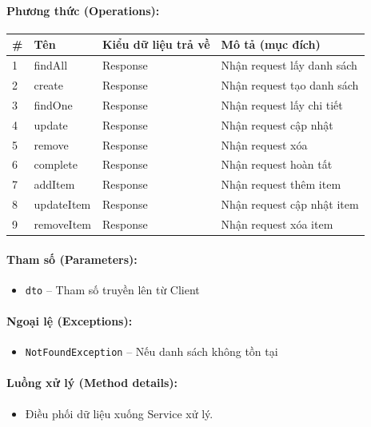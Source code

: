 \documentclass[12pt,a4paper]{article}
\begin{document}
\paragraph{Phương thức (Operations):}
\begin{longtable}{|p{0.6cm}|p{3.8cm}|p{2.6cm}|p{6.5cm}|}
\hline
\textbf{\#} & \textbf{Tên} & \textbf{Kiểu dữ liệu trả về} & \textbf{Mô tả (mục đích)} \\ \hline
\endhead
1 & findAll & Response & Nhận request lấy danh sách \\ \hline
2 & create & Response & Nhận request tạo danh sách \\ \hline
3 & findOne & Response & Nhận request lấy chi tiết \\ \hline
4 & update & Response & Nhận request cập nhật \\ \hline
5 & remove & Response & Nhận request xóa \\ \hline
6 & complete & Response & Nhận request hoàn tất \\ \hline
7 & addItem & Response & Nhận request thêm item \\ \hline
8 & updateItem & Response & Nhận request cập nhật item \\ \hline
9 & removeItem & Response & Nhận request xóa item \\ \hline
\end{longtable}

\paragraph{Tham số (Parameters):}
\begin{itemize}[leftmargin=*]
    \item \texttt{dto} – Tham số truyền lên từ Client
\end{itemize}


\paragraph{Ngoại lệ (Exceptions):}
\begin{itemize}[leftmargin=*]
    \item \texttt{NotFoundException} – Nếu danh sách không tồn tại
\end{itemize}


\paragraph{Luồng xử lý (Method details):}
\begin{itemize}[leftmargin=*]
    \item Điều phối dữ liệu xuống Service xử lý.
\end{itemize}
\end{document}

